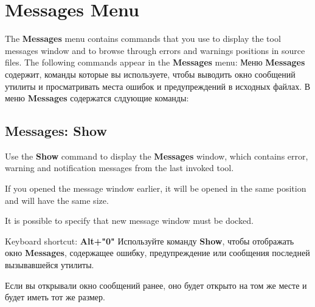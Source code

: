 \section{Messages Menu}
\nominitoc
\ifenglish
The {\bf Messages} menu contains commands that you use
to display the tool messages window and to browse through errors
and warnings positions in source files.
The following commands appear in the {\bf Messages} menu:
\else
Меню {\bf Messages} содержит, команды которые вы используете,
чтобы выводить окно сообщений утилиты и просматривать места ошибок и
предупреждений в исходных файлах.
В меню {\bf Messages} содержатся слдующие команды:
\fi
{}

\subsection{Messages: Show}

\ifenglish
Use the {\bf Show} command to display the {\bf Messages}
window, which contains error, warning and notification
messages from the last invoked tool.

If you opened the message window earlier, it will be opened in the
same position and will have the same size.

It is possible to specify that new message window must be docked.

Keyboard shortcut: {\bf Alt+"0"}
\else
Используйте команду {\bf Show}, чтобы отображать окно {\bf Messages},
содержащее ошибку, предупреждение или сообщения
последней вызывавшейся утилиты.

Если вы открывали окно сообщений ранее, оно будет открыто на том же месте
и будет иметь тот же размер.

